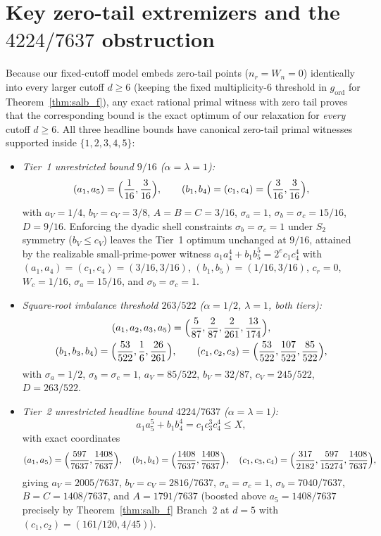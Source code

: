 \documentclass[11pt,a4paper]{amsart}
\theoremstyle{plain}
\theoremstyle{definition}
\theoremstyle{remark}
\begin{document}
\section{Key zero-tail extremizers and the \texorpdfstring{$4224/7637$}{4224/7637} obstruction}\label{sec:barriers}

Because our fixed-cutoff model embeds zero-tail points ($n_r = W_n = 0$) identically into every larger cutoff $d \ge 6$ (keeping the fixed multiplicity-$6$ threshold in $g_{\mathrm{ord}}$ for Theorem~\ref{thm:salb_f}), any exact rational primal witness with zero tail proves that the corresponding bound is the exact optimum of our relaxation for \emph{every} cutoff $d \ge 6$. All three headline bounds have canonical zero-tail primal witnesses supported inside $\{1,2,3,4,5\}$:
\begin{itemize}[itemsep=2pt]
\item \emph{Tier~1 unrestricted bound $9/16$ ($\alpha = \lambda = 1$):}
\[
  (a_1, a_5) = \Bigl(\frac{1}{16}, \frac{3}{16}\Bigr), \qquad
  (b_1, b_4) = (c_1, c_4) = \Bigl(\frac{3}{16}, \frac{3}{16}\Bigr),
\]
with $a_V = 1/4$, $b_V = c_V = 3/8$, $A = B = C = 3/16$, $\sigma_a = 1$, $\sigma_b = \sigma_c = 15/16$, $D = 9/16$. Enforcing the dyadic shell constraints $\sigma_b = \sigma_c = 1$ under $S_2$ symmetry ($b_V \le c_V$) leaves the Tier~1 optimum unchanged at $9/16$, attained by the realizable small-prime-power witness $a_1 a_4^4 + b_1 b_5^5 = 2^e c_1 c_4^4$ with $(a_1,a_4) = (c_1,c_4) = (3/16,3/16)$, $(b_1,b_5) = (1/16,3/16)$, $c_r = 0$, $W_c = 1/16$, $\sigma_a = 15/16$, and $\sigma_b = \sigma_c = 1$.
\item \emph{Square-root imbalance threshold $263/522$ ($\alpha = 1/2$, $\lambda = 1$, both tiers):}
\begin{gather*}
  (a_1,a_2,a_3,a_5) = \Bigl(\frac{5}{87}, \frac{2}{87}, \frac{2}{261}, \frac{13}{174}\Bigr), \\
  (b_1,b_3,b_4) = \Bigl(\frac{53}{522}, \frac{1}{6}, \frac{26}{261}\Bigr), \qquad
  (c_1,c_2,c_3) = \Bigl(\frac{53}{522}, \frac{107}{522}, \frac{85}{522}\Bigr),
\end{gather*}
with $\sigma_a = 1/2$, $\sigma_b = \sigma_c = 1$, $a_V = 85/522$, $b_V = 32/87$, $c_V = 245/522$, $D = 263/522$.
\item \emph{Tier~2 unrestricted headline bound $4224/7637$ ($\alpha = \lambda = 1$):}
\begin{equation}\label{eq:obstruction_eq}
  a_1 a_5^5 + b_1 b_4^4 = c_1 c_3^3 c_4^4 \le X,
\end{equation}
with exact coordinates
\[
  (a_1, a_5) = \Bigl(\frac{597}{7637}, \frac{1408}{7637}\Bigr), \quad
  (b_1, b_4) = \Bigl(\frac{1408}{7637}, \frac{1408}{7637}\Bigr), \quad
  (c_1, c_3, c_4) = \Bigl(\frac{317}{2182}, \frac{597}{15274}, \frac{1408}{7637}\Bigr),
\]
giving $a_V = 2005/7637$, $b_V = c_V = 2816/7637$, $\sigma_a = \sigma_c = 1$, $\sigma_b = 7040/7637$, $B = C = 1408/7637$, and $A = 1791/7637$ (boosted above $a_5 = 1408/7637$ precisely by Theorem~\ref{thm:salb_f} Branch~2 at $d=5$ with $(c_1,c_2) = (161/120, 4/45)$).
\end{itemize}
\end{document}
